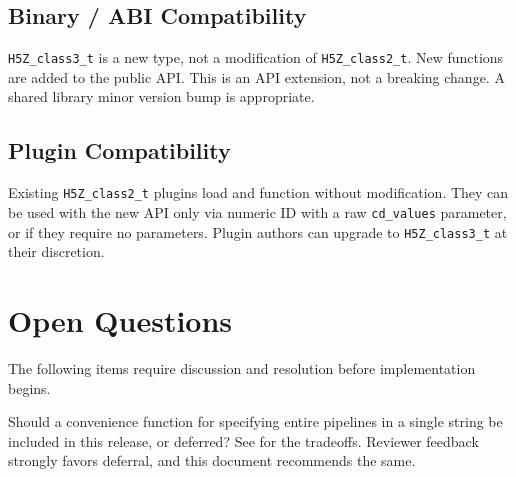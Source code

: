 \documentclass[../HDF5_RFC.tex]{subfiles}
\begin{document}
\subsection{Binary / ABI Compatibility}

\texttt{H5Z\_class3\_t} is a new type, not a modification of \texttt{H5Z\_class2\_t}. New
functions are added to the public API. This is an API extension, not a
breaking change. A shared library minor version bump is appropriate.

\subsection{Plugin Compatibility}

Existing \texttt{H5Z\_class2\_t} plugins load and function without modification. They
can be used with the new API only via numeric ID with a raw \texttt{cd\_values}
parameter, or if they require no parameters. Plugin authors can upgrade to
\texttt{H5Z\_class3\_t} at their discretion.


\section{Open Questions}
\label{sec:open-questions}

The following items require discussion and resolution before implementation
begins.

Should a convenience function for specifying
entire pipelines in a single string be included in this release, or deferred?
See  for the tradeoffs. Reviewer feedback
strongly favors deferral, and this document recommends the same.
\end{document}
